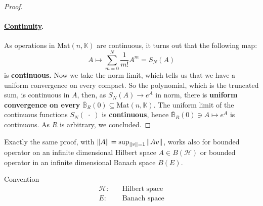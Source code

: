 \documentclass[../main.tex]{subfiles}
\begin{document}
\begin{proof}
\paragraph{\underline{Continuity}.} As operations in $\textrm{Mat}(n,\mathbb{K})$ are continuous, it turns out that the following map:
\[
A\mapsto \sum_{m=0}^N\frac{1}{m!}A^m=S_N(A)
\]
is \textbf{continuous.} Now we take the norm limit, which tells us that we have a uniform convergence on every compact.  So the polynomial, which is the truncated sum, is continuous in $A$, then, as $S_N(A)\to e^A$ in norm, there is \textbf{uniform convergence on every} $\overline{\mathbb{B}}_R(0)\subseteq \textrm{Mat}(n,\mathbb{K})$. The uniform limit of the continuous functions $S_N(\;\cdot\;)$ is \textbf{continuous}, hence $\overline{\mathbb{B}}_R(0)\ni A \mapsto e^A$ is continuous. As $R$ is arbitrary, we concluded.
\end{proof}
\begin{kaobox}[frametitle=Remark]
Exactly the same proof, with $\norm{A}=\sup_{\norm{v}=1}\norm{Av}$, works also for bounded operator on an infinite dimensional Hilbert space $A\in B(\mathcal{H})$ or bounded operator in an infinite dimensional Banach space $B(E)$.

Convention
\[
\begin{split}
\mathcal{H}: \quad &\textrm{Hilbert space}\\
E: \quad &\textrm{Banach space}
\end{split}
\]
\end{kaobox}
\end{document}
